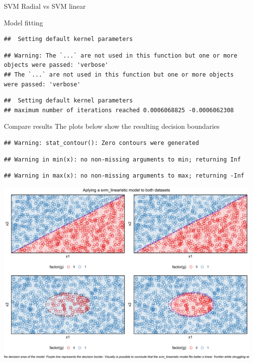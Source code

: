 \documentclass[
  ignorenonframetext,
]{article}
\begin{document}
\begin{frame}[fragile]{SVM Radial vs SVM linear}
\begin{block}{Model fitting}
\begin{verbatim}
##  Setting default kernel parameters
\end{verbatim}

\begin{verbatim}
## Warning: The `...` are not used in this function but one or more objects were passed: 'verbose'
## The `...` are not used in this function but one or more objects were passed: 'verbose'
\end{verbatim}

\begin{verbatim}
##  Setting default kernel parameters  
## maximum number of iterations reached 0.0006068825 -0.0006062308
\end{verbatim}
\end{block}

\begin{block}{Compare results}
\protect\hypertarget{compare-results-5}{}
The plots below show the resulting decision boundaries

\begin{verbatim}
## Warning: stat_contour(): Zero contours were generated
\end{verbatim}

\begin{verbatim}
## Warning in min(x): no non-missing arguments to min; returning Inf
\end{verbatim}

\begin{verbatim}
## Warning in max(x): no non-missing arguments to max; returning -Inf
\end{verbatim}

\begin{center}\includegraphics{_main_files/figure-beamer/unnamed-chunk-82-1} \end{center}


\end{block}
\end{frame}
\end{document}
